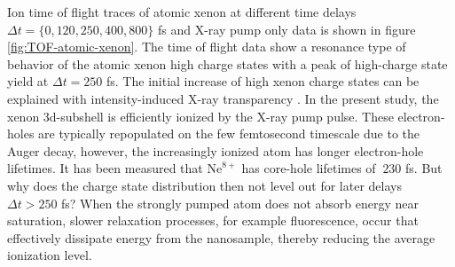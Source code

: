Ion time of flight traces of atomic xenon at different time delays $\Delta t = \{0, 120, 250, 400, 800\}$ fs and X-ray pump only data is shown in figure \ref{fig:TOF-atomic-xenon}. The time of flight data show a resonance type of behavior of the atomic xenon high charge states with a peak of high-charge state yield at $\Delta t = 250$ fs. The initial increase of high xenon charge states can be explained with intensity-induced X-ray transparency \citep{Young-2010-Nature}. In the present study, the xenon 3d-subshell is efficiently ionized by the X-ray pump pulse. These electron-holes are typically repopulated on the few femtosecond timescale due to the Auger decay, however, the increasingly ionized atom has longer electron-hole lifetimes. It has been measured that $\text{Ne}^{8+}$ has core-hole lifetimes of $~230$ fs. But why does the charge state distribution then not level out for later delays $\Delta t > 250$ fs? When the strongly pumped atom does not absorb energy near saturation, slower relaxation processes, for example fluorescence, occur that effectively dissipate energy from the nanosample, thereby reducing the average ionization level.\\
